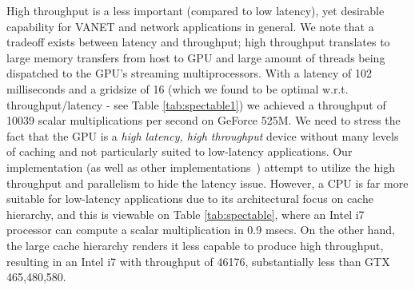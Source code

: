 \documentclass[11pt,twocolumn]{IEEEtran}
\begin{document}
High throughput is a less important (compared to low latency), yet desirable capability for VANET and network applications in general. We note that a tradeoff exists between latency and throughput; high throughput translates to large memory transfers from host to GPU and large amount of threads being dispatched to the GPU's streaming multiprocessors. With a latency of 102 milliseconds and a gridsize of 16 (which we found to be optimal w.r.t. throughput/latency - see Table \ref{tab:spectable1}) we achieved a throughput of 10039 scalar multiplications per second on GeForce 525M. We need to stress the fact that the GPU is a \emph{high latency, high throughput} device without many levels of caching and not particularly suited to low-latency applications. Our implementation (as well as other implementations~\cite{bos,antao,iambetterthanthem}) attempt to utilize the high throughput and parallelism to hide the latency issue. However, a CPU is far more suitable for low-latency applications due to its architectural focus on cache hierarchy, and this is viewable on Table \ref{tab:spectable}, where an Intel i7 processor can compute a scalar multiplication in 0.9 msecs. On the other hand, the large cache hierarchy renders it less capable to produce high throughput, resulting in an Intel i7 with throughput of 46176, substantially less than GTX 465,480,580.
\end{document}
